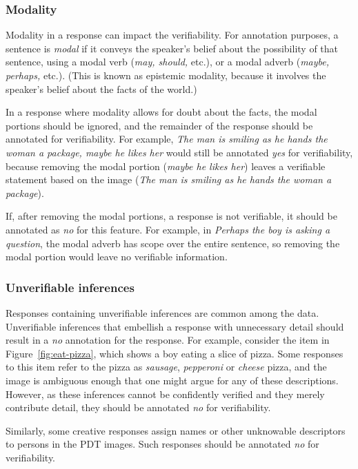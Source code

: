 \documentclass[12pt]{article}
\begin{document}
\subsubsection{Modality} Modality in a response can impact the verifiability. For annotation purposes, a sentence is \textit{modal} if it conveys the speaker's belief about the possibility of that sentence, using a modal verb (\textit{may, should,} etc.), or a modal adverb (\textit{maybe, perhaps,} etc.). (This is known as epistemic modality, because it involves the speaker's belief about the facts of the world.)

In a response where modality allows for doubt about the facts, the modal portions should be ignored, and the remainder of the response should be annotated for verifiability. For example, \textit{The man is smiling as he hands the woman a package, maybe he likes her} would still be annotated \textit{yes} for verifiability, because removing the modal portion (\textit{maybe he likes her}) leaves a verifiable statement based on the image (\textit{The man is smiling as he hands the woman a package}).

If, after removing the modal portions, a response is not verifiable, it should be annotated as \textit{no} for this feature. For example, in \textit{Perhaps the boy is asking a question}, the modal adverb has scope over the entire sentence, so removing the modal portion would leave no verifiable information.

\subsubsection{Unverifiable inferences} Responses containing unverifiable inferences are common among the data. Unverifiable inferences that embellish a response with unnecessary detail should result in a \textit{no} annotation for the response. For example, consider the item in Figure~\ref{fig:eat-pizza}, which shows a boy eating a slice of pizza. Some responses to this item refer to the pizza as \textit{sausage}, \textit{pepperoni} or \textit{cheese} pizza, and the image is ambiguous enough that one might argue for any of these descriptions. However, as these inferences cannot be confidently verified and they merely contribute detail, they should be annotated \textit{no} for verifiability.

Similarly, some creative responses assign names or other unknowable descriptors to persons in the PDT images. Such responses should be annotated \textit{no} for verifiability.
\end{document}
